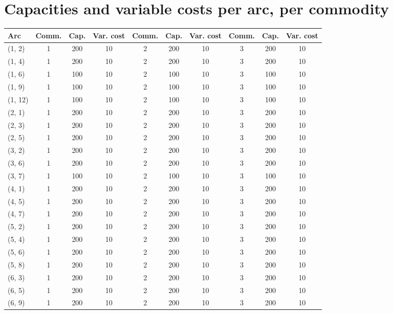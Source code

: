 \documentclass{article}
\begin{document}
\section{Capacities and variable costs per arc, per commodity}
\small
\begin{longtable}{||l||c|c|c||c|c|c||c|c|c||}
\hline
{Arc} & {Comm.} & {Cap.} & {Var. cost} & {Comm.} & {Cap.} & {Var. cost} & {Comm.} & {Cap.} & {Var. cost}\\
\hline
\endhead
(1, 2) & 1 & 200 & 10 & 2 & 200 & 10 & 3 & 200 & 10 \\
\hline
(1, 4) & 1 & 200 & 10 & 2 & 200 & 10 & 3 & 200 & 10 \\
\hline
(1, 6) & 1 & 100 & 10 & 2 & 100 & 10 & 3 & 100 & 10 \\
\hline
(1, 9) & 1 & 100 & 10 & 2 & 100 & 10 & 3 & 100 & 10 \\
\hline
(1, 12) & 1 & 100 & 10 & 2 & 100 & 10 & 3 & 100 & 10 \\
\hline
(2, 1) & 1 & 200 & 10 & 2 & 200 & 10 & 3 & 200 & 10 \\
\hline
(2, 3) & 1 & 200 & 10 & 2 & 200 & 10 & 3 & 200 & 10 \\
\hline
(2, 5) & 1 & 200 & 10 & 2 & 200 & 10 & 3 & 200 & 10 \\
\hline
(3, 2) & 1 & 200 & 10 & 2 & 200 & 10 & 3 & 200 & 10 \\
\hline
(3, 6) & 1 & 200 & 10 & 2 & 200 & 10 & 3 & 200 & 10 \\
\hline
(3, 7) & 1 & 100 & 10 & 2 & 100 & 10 & 3 & 100 & 10 \\
\hline
(4, 1) & 1 & 200 & 10 & 2 & 200 & 10 & 3 & 200 & 10 \\
\hline
(4, 5) & 1 & 200 & 10 & 2 & 200 & 10 & 3 & 200 & 10 \\
\hline
(4, 7) & 1 & 200 & 10 & 2 & 200 & 10 & 3 & 200 & 10 \\
\hline
(5, 2) & 1 & 200 & 10 & 2 & 200 & 10 & 3 & 200 & 10 \\
\hline
(5, 4) & 1 & 200 & 10 & 2 & 200 & 10 & 3 & 200 & 10 \\
\hline
(5, 6) & 1 & 200 & 10 & 2 & 200 & 10 & 3 & 200 & 10 \\
\hline
(5, 8) & 1 & 200 & 10 & 2 & 200 & 10 & 3 & 200 & 10 \\
\hline
(6, 3) & 1 & 200 & 10 & 2 & 200 & 10 & 3 & 200 & 10 \\
\hline
(6, 5) & 1 & 200 & 10 & 2 & 200 & 10 & 3 & 200 & 10 \\
\hline
(6, 9) & 1 & 200 & 10 & 2 & 200 & 10 & 3 & 200 & 10 \\

\end{longtable}
\end{document}
